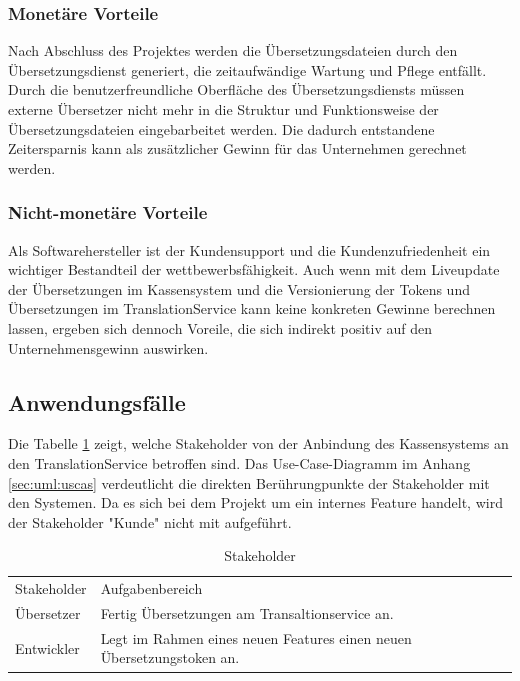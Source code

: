 \documentclass[10pt, oneside, ngerman]{article}
\begin{document}
    \subsubsection{Monetäre Vorteile}\label{sec:MV}
    Nach Abschluss des Projektes werden die Übersetzungsdateien durch den Übersetzungsdienst generiert, 
    die zeitaufwändige Wartung und Pflege entfällt. 
    Durch die benutzerfreundliche Oberfläche des Übersetzungsdiensts müssen externe Übersetzer 
    nicht mehr in die Struktur und Funktionsweise der Übersetzungsdateien eingebarbeitet werden. Die dadurch entstandene Zeitersparnis 
    kann als zusätzlicher Gewinn für das Unternehmen gerechnet werden.
  \subsubsection{Nicht-monetäre Vorteile}\label{sec:notMV}
    Als Softwarehersteller ist der Kundensupport und die Kundenzufriedenheit ein wichtiger Bestandteil der wettbewerbsfähigkeit.
    Auch wenn mit dem Liveupdate der Übersetzungen im Kassensystem und die Versionierung der Tokens 
    und Übersetzungen im TranslationService kann keine konkreten Gewinne berechnen lassen,
    ergeben sich dennoch Voreile, die sich indirekt positiv auf den Unternehmensgewinn auswirken. 
  \subsection{Anwendungsfälle}\label{sec:analyse:stakeholder}
    Die Tabelle \ref{tab:stakeholder} zeigt, welche Stakeholder von der Anbindung des Kassensystems an den TranslationService betroffen sind. 
    Das Use-Case-Diagramm im Anhang \ref{sec:uml:uscas} verdeutlicht die direkten Berührungpunkte der Stakeholder mit den Systemen. 
    Da es sich bei dem Projekt um ein internes Feature handelt, wird der Stakeholder "Kunde" nicht mit aufgeführt.
    \begin{table}[ht]
      \begin{tabular}{l l}
        \hline
        \rowcolor{carolinablue}
        Stakeholder & Aufgabenbereich\\
        Übersetzer & Fertig Übersetzungen am Transaltionservice an.\\
        \rowcolor{lightgray}
        Entwickler & Legt im Rahmen eines neuen Features einen neuen Übersetzungstoken an.\\
      \end{tabular}
      \caption{Stakeholder}
      \label{tab:stakeholder}
    \end{table}
\end{document}
